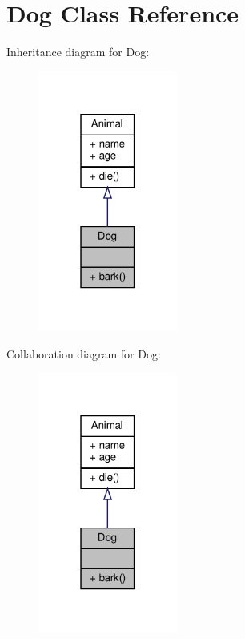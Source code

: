 \hypertarget{classDog}{}\section{Dog Class Reference}
\label{classDog}


Inheritance diagram for Dog\+:
\nopagebreak
\begin{figure}[H]
\begin{center}
\leavevmode
\includegraphics[width=130pt]{classDog__inherit__graph}
\end{center}
\end{figure}


Collaboration diagram for Dog\+:
\nopagebreak
\begin{figure}[H]
\begin{center}
\leavevmode
\includegraphics[width=130pt]{classDog__coll__graph}
\end{center}
\end{figure}
